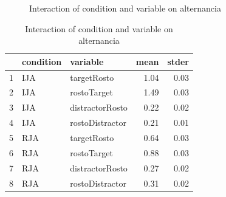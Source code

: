 \documentclass{article}
\begin{document}
\begin{figure}[H]
  \caption{Interaction of condition and variable on alternancia}
  \noindent{}
  \centering
\end{figure}

\begin{table}[ht]
\centering
\caption{Interaction of condition and variable on alternancia}
\begin{tabular}{rllrr}
  \hline
 & condition & variable & mean & stder \\ 
  \hline
1 & IJA & targetRosto & 1.04 & 0.03 \\ 
  2 & IJA & rostoTarget & 1.49 & 0.03 \\ 
  3 & IJA & distractorRosto & 0.22 & 0.02 \\ 
  4 & IJA & rostoDistractor & 0.21 & 0.01 \\ 
  5 & RJA & targetRosto & 0.64 & 0.03 \\ 
  6 & RJA & rostoTarget & 0.88 & 0.03 \\ 
  7 & RJA & distractorRosto & 0.27 & 0.02 \\ 
  8 & RJA & rostoDistractor & 0.31 & 0.02 \\ 
   \hline
\end{tabular}
\end{table}
\end{document}

